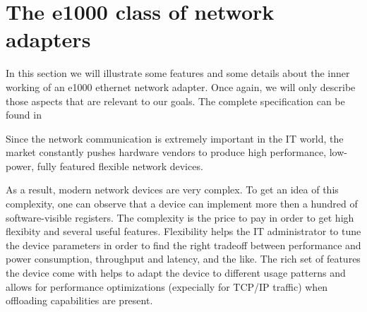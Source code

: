 \section{The e1000 class of network adapters}
In this section we will illustrate some features and some details about the inner working of an e1000 ethernet network adapter.
Once again, we will only describe those aspects that are relevant to our goals.
The complete specification can be found in %

\vspace{0.5cm}

Since the network communication is extremely important in the IT world, the market constantly pushes hardware vendors to produce high
performance, low-power, fully featured flexible network devices.

As a result, modern network devices are very complex. To get an idea of this complexity, one can observe that a device can implement 
more then a hundred of software-visible registers. The complexity is the price to pay in order to get high flexibity and several useful
features. Flexibility helps the IT administrator to tune the device parameters in order to find the right tradeoff between performance and 
power consumption, throughput and latency, and the like.
The rich set of features the device come with helps to adapt the device to different usage patterns and allows for performance 
optimizations (expecially for TCP/IP traffic) when offloading capabilities are present.

